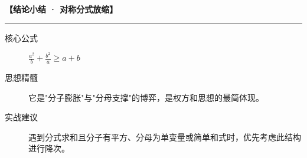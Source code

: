 \begin{summarybox}
\textbf{【结论小结 · 对称分式放缩】}
\vspace{0.8em}
\hrule
\vspace{0.8em}

\begin{description}
    \item[核心公式] $\frac{a^2}{b} + \frac{b^2}{a} \geqslant a+b$
    \item[思想精髓] 它是"分子膨胀"与"分母支撑"的博弈，是权方和思想的最简体现。
    \item[实战建议] 遇到分式求和且分子有平方、分母为单变量或简单和式时，优先考虑此结构进行降次。
\end{description}
\end{summarybox}